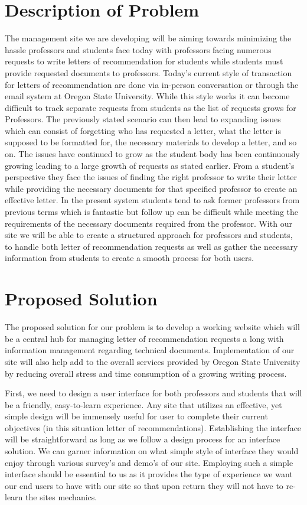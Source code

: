 \documentclass[onecolumn, draftclsnofoot,10pt, compsoc]{IEEEtran}
\begin{document}
\section*{Description of Problem}
\flushleft
The management site we are developing will be aiming towards minimizing the hassle professors and students face today with professors facing numerous requests to write letters of recommendation for students while students must provide requested documents to professors. Today’s current style of transaction for letters of recommendation are done via in-person conversation or through the email system at Oregon State University. While this style works it can become difficult to track separate requests from students as the list of requests grows for Professors. The previously stated scenario can then lead to expanding issues which can consist of forgetting who has requested a letter, what the letter is supposed to be formatted for, the necessary materials to develop a letter, and so on. The issues have continued to grow as the student body has been continuously growing leading to a large growth of requests as stated earlier. From a student’s perspective they face the issues of finding the right professor to write their letter while providing the necessary documents for that specified professor to create an effective letter. In the present system students tend to ask former professors from previous terms which is fantastic but follow up can be difficult while meeting the requirements of the necessary documents required from the professor.  With our site we will be able to create a structured approach for professors and students, to handle both letter of recommendation requests as well as gather the necessary information from students to create a smooth process for both users.    
\center
\section*{Proposed Solution}
\flushleft

The proposed solution for our problem is to develop a working website which will be a central hub for managing letter of recommendation requests a long with information management regarding technical documents. Implementation of our site will also help add to the overall services provided by Oregon State University by reducing overall stress and time consumption of a growing writing process. \vspace{4mm}

First, we need to design a user interface for both professors and students that will be a friendly, easy-to-learn experience. Any site that utilizes an effective, yet simple design will be immensely useful for user to complete their current objectives (in this situation letter of recommendations). Establishing the interface will be straightforward as long as we follow a design process for an interface solution. We can garner information on what simple style of interface they would enjoy through various survey’s and demo’s of our site. Employing such a simple interface should be essential to us as it provides the type of experience we want our end users to have with our site so that upon return they will not have to re-learn the sites mechanics.\vspace{4mm}
\end{document}
